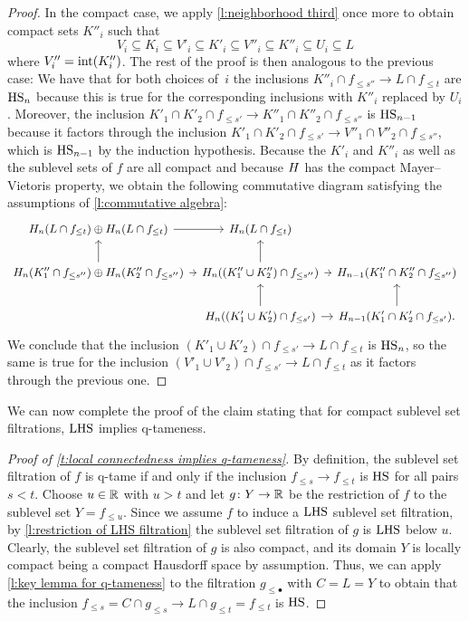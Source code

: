 \begin{proof}
	In the compact case, we apply \cref{l:neighborhood third} once more to obtain compact sets $K''_i$ such that
	\begin{equation*}
	V_i \subseteq K_i \subseteq V'_i \subseteq K'_i \subseteq V''_i \subseteq K''_i \subseteq U_i \subseteq L
	\end{equation*}
	where $V''_i = \operatorname{int}(K''_i)$.
	The rest of the proof is then analogous to the previous case:
	We have that for both choices of~$i$ the inclusions
	$K''_i \cap f_{\leq s''} \to L \cap f_{\leq t}$
	are $\mathrm{HS}_n$ because this is true for the corresponding inclusions with $K''_i$ replaced by $U_i$.
	Moreover, the inclusion
	$K'_1 \cap K'_2 \cap f_{\leq s'} \to K''_1 \cap K''_2 \cap f_{\leq s''}$
	is $\mathrm{HS}_{n-1}$ because it factors through the inclusion
	$K'_1 \cap K'_2 \cap f_{\leq s'} \to V''_1 \cap V''_2 \cap f_{\leq s''}$,
	which is $\mathrm{HS}_{n-1}$ by the induction hypothesis.
	Because the $K'_i$ and $K''_i$ as well as the sublevel sets of $f$ are all compact and because $H$ has the compact Mayer--Vietoris property, we obtain the following commutative diagram satisfying the assumptions of \cref{l:commutative algebra}:
	\[
	\begin{tikzcd}[column sep=tiny,every matrix/.append style={nodes={font=\small}}]
	\H_n(L \cap f_{\leq t}) \oplus \H_n(L \cap f_{\leq t}) \arrow[r] &
	\H_n(L \cap f_{\leq t}) & \\
	\H_{n}(K''_1 \cap f_{\leq s''}) \oplus \H_n(K''_2 \cap f_{\leq s''}) \arrow[r] \arrow[u] &
	\H_{n}((K''_1 \cup K''_2) \cap f_{\leq s''}) \arrow[r] \arrow[u] &
	\H_{n-1}(K''_1 \cap K''_2 \cap f_{\leq s''}) \\ &
	\H_{n}((K'_1 \cup K'_2) \cap f_{\leq s'}) \arrow[r] \arrow[u] &
	\H_{n-1}(K'_1 \cap K'_2 \cap f_{\leq s'}) \arrow[u].
	\end{tikzcd}
	\]
	We conclude that the inclusion
	$\left(K'_1 \cup K'_2 \right) \cap f_{\leq s'} \to L \cap f_{\leq t}$
	is $\mathrm{HS}_n$, so the same is true for the inclusion
	$\left(V'_1 \cup V'_2 \right) \cap f_{\leq s'} \to L \cap f_{\leq t}$
	as it factors through the previous one.
\end{proof}

We can now complete the proof of the claim stating that for compact sublevel set filtrations, $\mathrm{LHS}$ implies q-tameness.

\begin{proof}[Proof of \cref{t:local connectedness implies q-tameness}]
	By definition, the sublevel set filtration of $f$ is q-tame if and only if the inclusion $f_{\leq s} \to f_{\leq t}$ is $\mathrm{HS}$ for all pairs $s < t$.
	Choose $u \in \mathbb{R}$ with $u > t$ and let $g \colon Y \to \mathbb{R}$ be the restriction of $f$ to the sublevel set $Y=f_{\leq u}$.
	Since we assume $f$ to induce a $\mathrm{LHS}$ sublevel set filtration, by \cref{l:restriction of LHS filtration} the sublevel set filtration of $g$ is $\mathrm{LHS}$ below $u$.
	Clearly, the sublevel set filtration of $g$ is also compact, and its domain $Y$ is locally compact being a compact Hausdorff space by assumption.
	Thus, we can apply \cref{l:key lemma for q-tameness} to the filtration $g_{\leq \bullet}$ with $C = L = Y$ to obtain that the inclusion $f_{\leq s} = C \cap g_{\leq s} \to L \cap g_{\leq t} = f_{\leq t}$ is $\mathrm{HS}$.
\end{proof}
